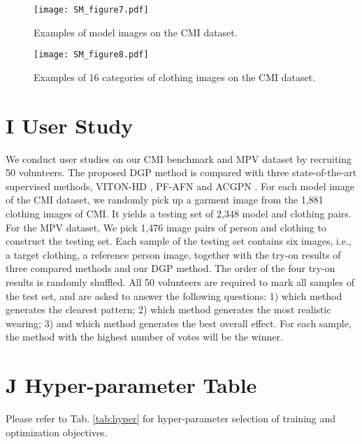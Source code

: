 \documentclass[10pt,twocolumn,letterpaper]{article}
\begin{document}
\begin{figure}[h]
  \centering
  \texttt{[image: SM\_figure7.pdf]}
  \caption{Examples of model images on the CMI dataset.}\label{fig: SM_CMI_dataset}
\end{figure}


\begin{figure}[h]
  \centering
  \texttt{[image: SM\_figure8.pdf]}
  \caption{Examples of 16 categories of clothing images on the CMI dataset.}\label{fig: SM_CMI_dataset_cloth}
\end{figure}

\section*{I User Study}
We conduct user studies on our CMI benchmark and MPV \cite{dong2019towards} dataset by recruiting 50 volunteers.
The proposed DGP method is compared with three state-of-the-art supervised
methods, VITON-HD  \cite{choi2021viton}, PF-AFN \cite{ge2021parser,han2019clothflow} and ACGPN \cite{yang2020towards}. 
For each model image of the CMI dataset, we randomly pick up a garment image from the 1,881 clothing images of CMI. It yields a testing set of 2,348
model and clothing pairs. 
For the MPV dataset, We pick 1,476 image pairs of person and clothing to construct the testing set.
Each sample of the testing set contains six images, i.e., a target clothing, a reference person image, together with the try-on results of three compared methods and our DGP method. The order of the four try-on results is randomly shuffled. All 50 volunteers are required to mark all samples of the test set, and are asked to answer the following questions: 1) which method generates the clearest pattern; 2) which method generates the most realistic wearing; 3) and which method generates the
best overall effect. For each sample, the method with the highest number of votes will be the winner.






\section*{J Hyper-parameter Table}
Please refer to Tab. \ref{tab:hyper} for hyper-parameter selection of training and optimization objectives.
\end{document}
